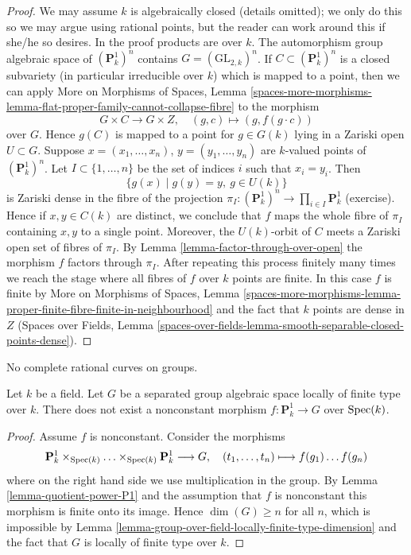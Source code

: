 \begin{proof}
We may assume $k$ is algebraically closed (details omitted); we only
do this so we may argue using rational points, but the reader can work
around this if she/he so desires. In the proof products are over $k$.
The automorphism group algebraic space of $(\mathbf{P}^1_k)^n$ contains
$G = (\text{GL}_{2, k})^n$. If $C \subset (\mathbf{P}^1_k)^n$ is a
closed subvariety (in particular irreducible over $k$) which is mapped
to a point, then we can apply
More on Morphisms of Spaces,
Lemma \ref{spaces-more-morphisms-lemma-flat-proper-family-cannot-collapse-fibre}
to the morphism
$$
G \times C \to G \times Z,\quad (g, c) \mapsto (g, f(g \cdot c))
$$
over $G$. Hence $g(C)$ is mapped to a point for $g \in G(k)$
lying in a Zariski open $U \subset G$. Suppose
$x = (x_1, \ldots, x_n)$, $y = (y_1, \ldots, y_n)$
are $k$-valued points of $(\mathbf{P}^1_k)^n$. Let
$I \subset \{1, \ldots, n\}$ be the set of indices $i$
such that $x_i = y_i$. Then
$$
\{g(x) \mid g(y) = y,\ g \in U(k)\}
$$
is Zariski dense in the fibre of the projection
$\pi_I : (\mathbf{P}^1_k)^n \to \prod_{i \in I} \mathbf{P}^1_k$
(exercise). Hence if $x, y \in C(k)$ are distinct, we conclude
that $f$ maps the whole fibre of $\pi_I$ containing $x, y$ to a
single point. Moreover, the $U(k)$-orbit of $C$ meets a Zariski
open set of fibres of $\pi_I$. By Lemma \ref{lemma-factor-through-over-open}
the morphism $f$ factors through $\pi_I$.
After repeating this process finitely many times we reach
the stage where all fibres of $f$ over $k$ points are finite.
In this case $f$ is finite by
More on Morphisms of Spaces, Lemma
\ref{spaces-more-morphisms-lemma-proper-finite-fibre-finite-in-neighbourhood}
and the fact that $k$ points are dense in $Z$
(Spaces over Fields, Lemma
\ref{spaces-over-fields-lemma-smooth-separable-closed-points-dense}).
\end{proof}

\begin{lemma}
\label{lemma-no-nonconstant-morphism-from-P1-to-group}
\begin{slogan}
No complete rational curves on groups.
\end{slogan}
Let $k$ be a field. Let $G$ be a separated group algebraic space locally
of finite type over $k$. There does not exist a nonconstant
morphism $f : \mathbf{P}^1_k \to G$ over $\mathop{\mathrm{Spec}}(k)$.
\end{lemma}

\begin{proof}
Assume $f$ is nonconstant. Consider the morphisms
$$
\mathbf{P}^1_k \times_{\mathop{\mathrm{Spec}}(k)} \ldots \times_{\mathop{\mathrm{Spec}}(k)} \mathbf{P}^1_k
\longrightarrow G,
\quad (t_1, \ldots, t_n) \longmapsto f(g_1) \ldots f(g_n)
$$
where on the right hand side we use multiplication in the group.
By Lemma \ref{lemma-quotient-power-P1} and the assumption that $f$
is nonconstant this morphism is finite onto its image.
Hence $\dim(G) \geq n$ for all $n$, which is impossible by
Lemma \ref{lemma-group-over-field-locally-finite-type-dimension}
and the fact that $G$ is locally of finite type over $k$.
\end{proof}




